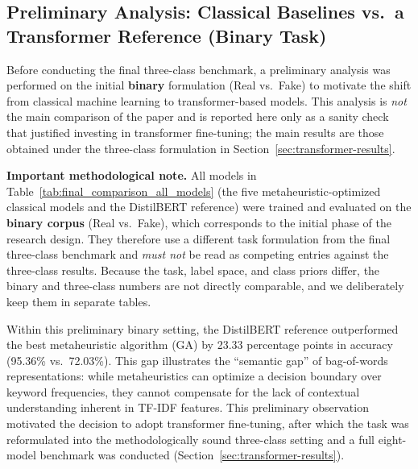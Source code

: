 \documentclass[informatics,article,submit,pdftex,moreauthors]{Definitions/mdpi}
\begin{document}
\subsection{Preliminary Analysis: Classical Baselines vs.\ a Transformer Reference (Binary Task)}
Before conducting the final three-class benchmark, a preliminary analysis was performed on the initial \textbf{binary} formulation (Real vs.\ Fake) to motivate the shift from classical machine learning to transformer-based models. This analysis is \emph{not} the main comparison of the paper and is reported here only as a sanity check that justified investing in transformer fine-tuning; the main results are those obtained under the three-class formulation in Section~\ref{sec:transformer-results}.

\textbf{Important methodological note.} All models in Table~\ref{tab:final_comparison_all_models} (the five metaheuristic-optimized classical models and the DistilBERT reference) were trained and evaluated on the \textbf{binary corpus} (Real vs.\ Fake), which corresponds to the initial phase of the research design. They therefore use a different task formulation from the final three-class benchmark and \emph{must not} be read as competing entries against the three-class results. Because the task, label space, and class priors differ, the binary and three-class numbers are not directly comparable, and we deliberately keep them in separate tables.

Within this preliminary binary setting, the DistilBERT reference outperformed the best metaheuristic algorithm (GA) by 23.33 percentage points in accuracy (95.36\% vs.\ 72.03\%). This gap illustrates the ``semantic gap'' of bag-of-words representations: while metaheuristics can optimize a decision boundary over keyword frequencies, they cannot compensate for the lack of contextual understanding inherent in TF-IDF features. This preliminary observation motivated the decision to adopt transformer fine-tuning, after which the task was reformulated into the methodologically sound three-class setting and a full eight-model benchmark was conducted (Section~\ref{sec:transformer-results}).
\end{document}
